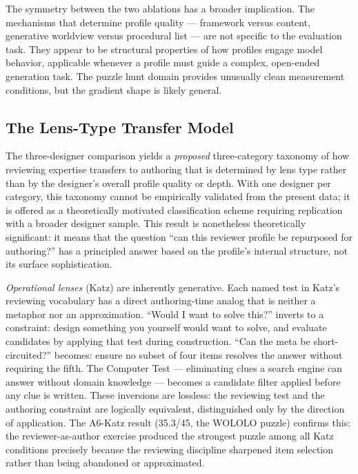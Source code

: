 The symmetry between the two ablations has a broader implication. The mechanisms that determine profile quality — framework versus content, generative worldview versus procedural list — are not specific to the evaluation task. They appear to be structural properties of how profiles engage model behavior, applicable whenever a profile must guide a complex, open-ended generation task. The puzzle hunt domain provides unusually clean measurement conditions, but the gradient shape is likely general.

\subsection{The Lens-Type Transfer Model}

The three-designer comparison yields a \emph{proposed} three-category taxonomy of how reviewing expertise transfers to authoring that is determined by lens type rather than by the designer's overall profile quality or depth. With one designer per category, this taxonomy cannot be empirically validated from the present data; it is offered as a theoretically motivated classification scheme requiring replication with a broader designer sample. This result is nonetheless theoretically significant: it means that the question ``can this reviewer profile be repurposed for authoring?'' has a principled answer based on the profile's internal structure, not its surface sophistication.

\textit{Operational lenses} (Katz) are inherently generative. Each named test in Katz's reviewing vocabulary has a direct authoring-time analog that is neither a metaphor nor an approximation. ``Would I want to solve this?'' inverts to a constraint: design something you yourself would want to solve, and evaluate candidates by applying that test during construction. ``Can the meta be short-circuited?'' becomes: ensure no subset of four items resolves the answer without requiring the fifth. The Computer Test — eliminating clues a search engine can answer without domain knowledge — becomes a candidate filter applied before any clue is written. These inversions are lossless: the reviewing test and the authoring constraint are logically equivalent, distinguished only by the direction of application. The A6-Katz result (35.3/45, the WOLOLO puzzle) confirms this: the reviewer-as-author exercise produced the strongest puzzle among all Katz conditions precisely because the reviewing discipline sharpened item selection rather than being abandoned or approximated.

